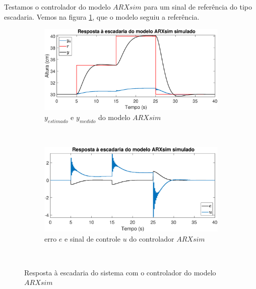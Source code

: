 Testamos o controlador do modelo $ARXsim$ para um sinal de referência do tipo escadaria. Vemos na figura \ref{fig:stairsarxsimy}, que o modelo seguiu a referência.

\begin{figure}[htb]
	\centering
	\begin{subfigure}[t]{0.48\textwidth}
		\includegraphics[width=1\linewidth]{pasta1_figuras/stairsarxsimy}
		\caption[$y_{estimado}$ e $y_{medido}$ do modelo $ARX2$]{$y_{estimado}$ e $y_{medido}$ do modelo $ARXsim$}
		\label{fig:stairsarxsimy}
	\end{subfigure}
	~ %
	\begin{subfigure}[t]{0.48\textwidth}
		\includegraphics[width=1\linewidth]{pasta1_figuras/stairsarxsime}
		\caption[erro $e$ e sinal de controle $u$ do controlador $ARX2$]{erro $e$ e sinal de controle $u$ do controlador $ARXsim$}
		\label{fig:stairsarxsime}
	\end{subfigure}
	~ %
	
	\caption{Resposta à escadaria do sistema com o controlador do modelo $ARXsim$}\label{fig:stairsarxsim}
\end{figure}

